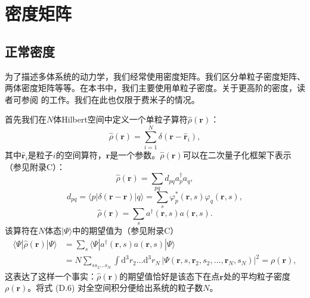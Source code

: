 
\chapter{密度矩阵}

\section{正常密度}

为了描述多体系统的动力学，我们经常使用密度矩阵。我们区分单粒子密度矩阵、两体密度矩阵等等。在本书中，我们主要使用单粒子密度。关于更高阶的密度，读者可参阅
\cite{Th61b} 的工作。我们在此也仅限于费米子的情况。

首先我们在$N$体Hilbert空间中定义一个单粒子算符$\hat{\rho}(\boldsymbol{r})$：
\begin{equation}
\hat{\rho}(\boldsymbol{r})=\sum^{N}_{i=1}\delta(\boldsymbol{r}-\hat{\boldsymbol{r}}_{i}),\label{eq:appendix_d_density_op}
\end{equation}
其中$\hat{\boldsymbol{r}}_{i}$是粒子$i$的空间算符，$\boldsymbol{r}$是一个参数。$\hat{\rho}(\boldsymbol{r})$可以在二次量子化框架下表示（参见附录C）：
\begin{equation}
\hat{\rho}(\boldsymbol{r})=\sum_{pq}d_{pq}a^{\dagger}_{p}a_{q},\label{eq:appendix_d_density_second_quant}
\end{equation}
\begin{equation}
d_{pq}=\langle p|\delta(\boldsymbol{r}-\hat{\boldsymbol{r}})|q\rangle=\sum_{s}\varphi^{*}_{p}(\boldsymbol{r},s)\varphi_{q}(\boldsymbol{r},s),\label{eq:appendix_d_dpq}
\end{equation}
\begin{equation}
\hat{\rho}(\boldsymbol{r})=\sum_{s}a^{\dagger}(\boldsymbol{r},s)a(\boldsymbol{r},s).\label{eq:appendix_d_density_field}
\end{equation}
该算符在$N$体态$|\Psi\rangle$中的期望值为（参见附录C）
\begin{align}
\langle\Psi|\hat{\rho}(\boldsymbol{r})|\Psi\rangle & =\sum_{s}\langle\Psi|a^{\dagger}(\boldsymbol{r},s)a(\boldsymbol{r},s)|\Psi\rangle\label{eq:appendix_d_rho_exp_field}\\
 & =N\sum_{ss_{2}\dots s_{N}}\int\mathrm{d}^{3}r_{2}\dots\mathrm{d}^{3}r_{N}\,\left|\Psi(\boldsymbol{r},s,\boldsymbol{r}_{2},s_{2},\dots,\boldsymbol{r}_{N},s_{N})\right|^{2}=\rho(\boldsymbol{r}),\label{eq:appendix_d_rho_exp_coord}
\end{align}
这表达了这样一个事实：$\hat{\rho}(\boldsymbol{r})$的期望值恰好是该态下在点$\boldsymbol{r}$处的平均粒子密度$\rho(\boldsymbol{r})$。将式
(D.6) 对全空间积分便给出系统的粒子数$N$。


